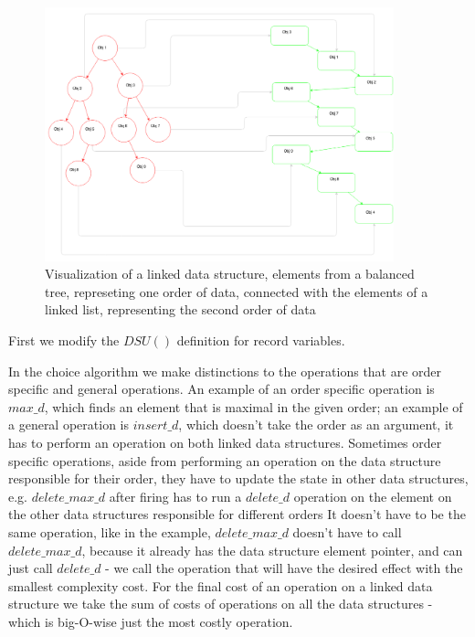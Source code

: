 \documentclass[a4paper,11pt]{article}
\begin{document}
            \begin{figure}[h!]
                \begin{center}
                    \includegraphics[width=0.9\textwidth]{thesis-pics/linked-dses.png}
                \end{center}

				\caption{Visualization of a linked data structure, elements from a balanced tree, represeting one order of data,
                 connected with the elements of a linked list, representing the second order of data}
				\label{fig:linked-data-structures}
			\end{figure}

            First we modify the $DSU()$ definition for record variables.

            In the choice algorithm we make distinctions to the operations that are order specific and general
            operations. An example of an order specific operation is $max\_d$, which finds an element that is maximal in
            the given order; an example of a general operation is $insert\_d$, which doesn't take the order as an
            argument, it has to perform an operation on both linked data structures. Sometimes order specific
            operations, aside from performing an operation on the data structure responsible for their order, they have
            to update the state in other data structures, e.g. $delete\_max\_d$ after firing has to run a $delete\_d$
            operation on the element on the other data structures responsible for different orders It doesn't have to
            be the same operation, like in the example, $delete\_max\_d$ doesn't have to call $delete\_max\_d$, because
            it already has the data structure element pointer, and can just call $delete\_d$ - we call the operation
            that will have the desired effect with the smallest complexity cost. For the final cost of an operation on a
            linked data structure we take the sum of costs of operations on all the data structures - which is
            big-O-wise just the most costly operation.
\end{document}
